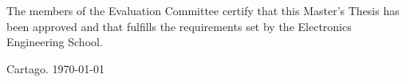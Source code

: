 \vfill

The members of the Evaluation Committee certify that this Master's Thesis has 
been approved and that fulfills the requirements set by the Electronics 
Engineering School.


\vfill

\begin{center}
  Cartago. \today\par
\end{center}

\cleardoublepage

